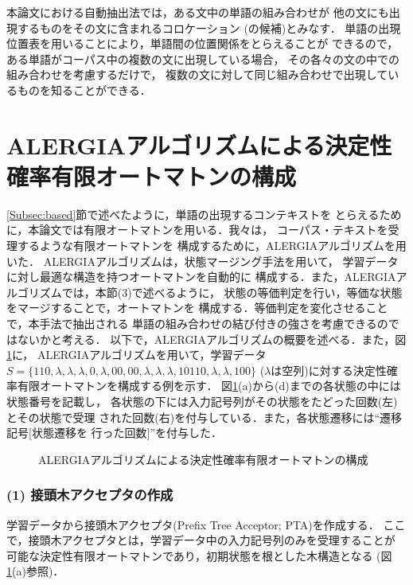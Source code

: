 本論文における自動抽出法では，ある文中の単語の組み合わせが
他の文にも出現するものをその文に含まれるコロケーション
(の候補)とみなす．
単語の出現位置表を用いることにより，単語間の位置関係をとらえることが
できるので，ある単語がコーパス中の複数の文に出現している場合，
その各々の文の中での組み合わせを考慮するだけで，
複数の文に対して同じ組み合わせで出現しているものを知ることができる．

\section{ALERGIAアルゴリズムによる決定性確率有限オートマトンの構成}
\label{Sec:alergia_algorithm}

\ref{Subsec:based}節で述べたように，単語の出現するコンテキストを
とらえるために，本論文では有限オートマトンを用いる．我々は，
コーパス・テキストを受理するような有限オートマトンを
構成するために，ALERGIAアルゴリズム\cite{Carrasco94}を用いた．
ALERGIAアルゴリズムは，状態マージング手法を用いて，
学習データに対し最適な構造を持つオートマトンを自動的に
構成する．また，ALERGIAアルゴリズムでは，本節(3)で述べるように，
状態の等価判定を行い，等価な状態をマージすることで，オートマトンを
構成する．等価判定を変化させることで，本手法で抽出される
単語の組み合わせの結び付きの強さを考慮できるのではないかと考える．
以下で，ALERGIAアルゴリズムの概要を述べる．また，図\ref{Fig:pta2dsfa}に，
ALERGIAアルゴリズムを用いて，学習データ\(S=\{110,\lambda,\lambda,
\lambda,0,\lambda,00,00,\lambda,\lambda,\lambda,10110,\lambda,\lambda,100\}\)
($\lambda$は空列)に対する決定性確率有限オートマトンを構成する例を示す．
図\ref{Fig:pta2dsfa}(a)から(d)までの各状態の中には状態番号を記載し，
各状態の下には入力記号列がその状態をたどった回数(左)とその状態で受理
された回数(右)を付与している．また，各状態遷移には``遷移記号[状態遷移を
行った回数]''を付与した．
\begin{figure}[hbt]
\begin{center}
\end{center}
\caption{ALERGIAアルゴリズムによる決定性確率有限オートマトンの構成}
\label{Fig:pta2dsfa}
\end{figure}

\subsubsection*{(1) 接頭木アクセプタの作成}

学習データから接頭木アクセプタ(Prefix Tree Acceptor; PTA)を作成する．
ここで，接頭木アクセプタとは，学習データ中の入力記号列のみを受理することが
可能な決定性有限オートマトンであり，初期状態を根とした木構造となる
(図\ref{Fig:pta2dsfa}(a)参照)．

